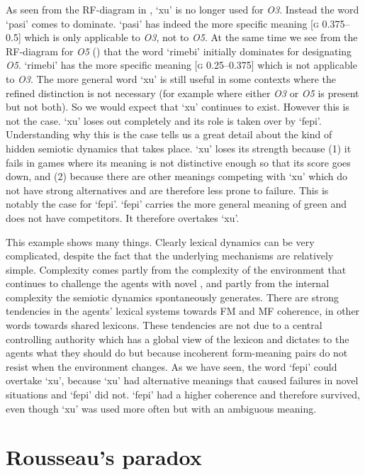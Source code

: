 As seen from the RF-diagram in , `xu' is no
longer used for \emph{O3}. Instead the word `pasi' comes to 
dominate. `pasi' has indeed the more specific 
meaning [\textsc{g} 0.375–0.5] which is only applicable to \emph{O3}, 
not to \emph{O5}. At the same time we see from the RF-diagram 
for \emph{O5} ()
that the word `rimebi' initially dominates for designating \emph{O5}. 
`rimebi' has the more specific meaning [\textsc{g} 0.25–0.375] which 
is not applicable to \emph{O3}. 
The more general word `xu' is still useful in some 
contexts where the
refined distinction is not necessary (for example where 
either \emph{O3} or \emph{O5} is present but not both). So we would expect
that `xu' continues to exist. However this is not the case. `xu'
loses out completely and its role is taken over by `fepi'. 
\clearpage
Understanding why this is the case
tells us a great detail about the kind 
of hidden semiotic dynamics that takes place. `xu' loses its
strength because (1) it fails in games where its meaning
is not distinctive enough so that its score goes
down, and (2) because there 
are other meanings competing with `xu' which do not 
have strong alternatives and are therefore
less prone to failure. This is notably the case for
`fepi'. `fepi' carries the more general meaning of green
and does not have competitors. It therefore overtakes
`xu'. 

This example shows many things. Clearly
lexical dynamics can be very complicated, despite the 
fact that the underlying mechanisms are relatively 
simple. Complexity comes partly from the complexity of
the environment that continues to challenge the agents
with novel , and partly from the internal 
complexity the semiotic dynamics spontaneously generates. 
There are strong tendencies in the agents' lexical systems
towards FM and MF coherence, 
in other words towards shared lexicons. These tendencies
are not due to a central controlling authority which 
has a global view of the lexicon and dictates to the 
agents what they should do but because incoherent 
form-meaning pairs do not resist when the environment 
changes. As we have seen, the word `fepi' could 
overtake `xu', because `xu' had alternative meanings that 
caused failures in novel situations and `fepi' did not. 
`fepi' had a higher coherence and therefore survived, even
though `xu' was used more often but with an 
ambiguous meaning. 

\section{Rousseau's paradox}

